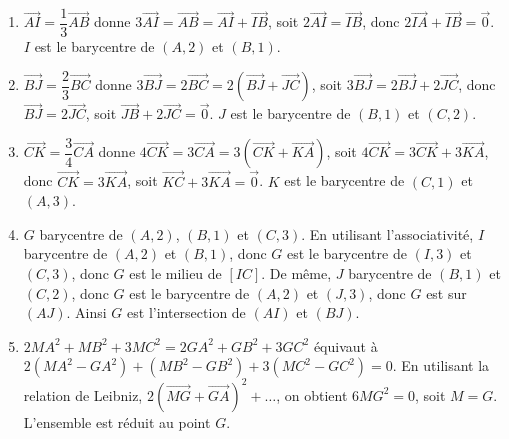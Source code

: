 \begin{enumerate}[label=\arabic*)]
\item $\overrightarrow{AI} = \dfrac{1}{3}\overrightarrow{AB}$ donne $3\overrightarrow{AI} = \overrightarrow{AB} = \overrightarrow{AI} + \overrightarrow{IB}$, soit $2\overrightarrow{AI} = \overrightarrow{IB}$, donc $2\overrightarrow{IA} + \overrightarrow{IB} = \vec{0}$. $I$ est le barycentre de $(A,2)$ et $(B,1)$.
\item $\overrightarrow{BJ} = \dfrac{2}{3}\overrightarrow{BC}$ donne $3\overrightarrow{BJ} = 2\overrightarrow{BC} = 2(\overrightarrow{BJ} + \overrightarrow{JC})$, soit $3\overrightarrow{BJ} = 2\overrightarrow{BJ} + 2\overrightarrow{JC}$, donc $\overrightarrow{BJ} = 2\overrightarrow{JC}$, soit $\overrightarrow{JB} + 2\overrightarrow{JC} = \vec{0}$. $J$ est le barycentre de $(B,1)$ et $(C,2)$.
\item $\overrightarrow{CK} = \dfrac{3}{4}\overrightarrow{CA}$ donne $4\overrightarrow{CK} = 3\overrightarrow{CA} = 3(\overrightarrow{CK} + \overrightarrow{KA})$, soit $4\overrightarrow{CK} = 3\overrightarrow{CK} + 3\overrightarrow{KA}$, donc $\overrightarrow{CK} = 3\overrightarrow{KA}$, soit $\overrightarrow{KC} + 3\overrightarrow{KA} = \vec{0}$. $K$ est le barycentre de $(C,1)$ et $(A,3)$.
\item $G$ barycentre de $(A,2)$, $(B,1)$ et $(C,3)$. En utilisant l'associativité, $I$ barycentre de $(A,2)$ et $(B,1)$, donc $G$ est le barycentre de $(I,3)$ et $(C,3)$, donc $G$ est le milieu de $[IC]$. De même, $J$ barycentre de $(B,1)$ et $(C,2)$, donc $G$ est le barycentre de $(A,2)$ et $(J,3)$, donc $G$ est sur $(AJ)$. Ainsi $G$ est l'intersection de $(AI)$ et $(BJ)$.
\item $2MA^2 + MB^2 + 3MC^2 = 2GA^2 + GB^2 + 3GC^2$ équivaut à $2(MA^2 - GA^2) + (MB^2 - GB^2) + 3(MC^2 - GC^2) = 0$. En utilisant la relation de Leibniz, $2(\overrightarrow{MG} + \overrightarrow{GA})^2 + \dots$, on obtient $6MG^2 = 0$, soit $M = G$. L'ensemble est réduit au point $G$.
\end{enumerate}